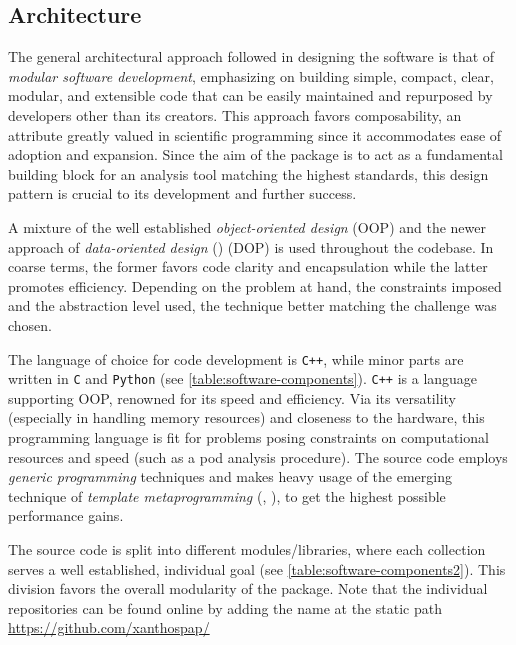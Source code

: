 \subsection{Architecture}\label{sec:the-software-architecture}
The general architectural approach followed in designing the software is that of 
\emph{modular software development}, emphasizing on building simple, compact, 
clear, modular, and extensible code that can be easily maintained and repurposed 
by developers other than its creators. This approach favors composability, an attribute 
greatly valued in scientific programming since it accommodates ease of adoption and 
expansion. Since the aim of the package is to act as a fundamental building block 
for an analysis tool matching the highest standards, this design pattern is crucial 
to its development and further success.

A mixture of the well established \emph{object-oriented design} (OOP) and the 
newer approach of \emph{data-oriented design} (\cite{Fabian2018}) (DOP) is used 
throughout the codebase. In coarse terms, the former favors code clarity and 
encapsulation while the latter promotes efficiency. Depending on the problem at 
hand, the constraints imposed and the abstraction level used, the technique better 
matching the challenge was chosen.

The language of choice for code development is \texttt{C++}, while minor parts 
are written in \texttt{C} and \texttt{Python} (see \autoref{table:software-components}). 
\texttt{C++} is a language supporting OOP, renowned for its speed and efficiency. 
Via its versatility (especially in handling memory resources) and closeness to 
the hardware, this programming language is fit for problems posing constraints on 
computational resources and speed (such as a \gls{pod} analysis procedure). The source 
code employs \emph{generic programming} techniques and makes heavy usage of the 
emerging technique of \emph{template metaprogramming} (\cite{Esterie2014}, 
\cite{Gawlik2018}), to get the highest possible performance gains.

The source code is split into different modules/libraries, where each collection 
serves a well established, individual goal (see \autoref{table:software-components2}). 
This division favors the overall modularity of the package.
Note that the individual repositories can be found online by adding the name at the static path \url{https://github.com/xanthospap/}

